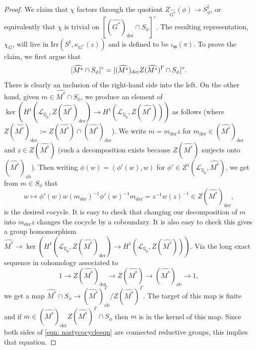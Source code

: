 \documentclass[reqno,11pt]{amsart}
\theoremstyle{remark}
\newcommand{\Irr}{\mathrm{Irr}}
\newcommand{\mc}{\mathcal}
\newcommand{\mf}{\mathfrak}
\newcommand{\Q}{\mathbb{Q}}
\newcommand{\der}{\mathrm{der}}
\newcommand{\ab}{\mathrm{ab}}
\begin{document}
\begin{proof}
We claim that $\chi$ factors through the quotient $Z_{\widehat{G^*}}(\phi) \to S^{\natural}_{\phi}$, or equivalently that $\chi$ is trivial on $[(\widehat{G^*})_{\der} \cap S_{\phi}]^{\circ}$. The resulting representation, $\chi_G$, will live in $\Irr(S^{\natural}, \kappa_{G^*}(z))$ and is defined to be $\iota_{\mf{w}}(\pi)$. To prove the claim, we first argue that
\begin{equation}{\label{eqn: nastycocycleeqn}}
    [\widehat{M^*} \cap S_{\phi}]^{\circ} =  [(\widehat{M^*})_{\der}Z(\widehat{M^*})^{\Gamma} \cap S_{\phi}]^{\circ}.
\end{equation}
There is clearly an inclusion of the right-hand side into the left. On the other hand, given $m \in \widehat{M^*} \cap S_{\phi}$, we produce an element of $\ker(H^1(\mc{L}_{\Q_p}, Z(\widehat{M^*})_{\der}) \to H^1(\mc{L}_{\Q_p}, Z(\widehat{M^*})))$ as follows (where $Z(\widehat{M^*})_{\der} := Z(\widehat{M^*}) \cap (\widehat{M^*})_{\der}$). We write $m = m_{\der}z$ for $m_{\der} \in (\widehat{M^*})_{\der}$ and  $z \in Z(\widehat{M^*})$ (such a decomposition exists because $Z(\widehat{M^*})$ surjects onto $(\widehat{M^*})_{\ab}$). Then writing $\phi(w) = (\phi'(w), w)$ for $\phi' \in Z^1(\mc{L}_{\Q_p}, \widehat{M^*})$, we get from $m \in S_{\phi}$ that 
\begin{equation*}
    w \mapsto \phi'(w)w(m_{\der})^{-1}\phi'(w)^{-1}m_{\der} = z^{-1}w(z)^{-1} \in Z(\widehat{M^*})_{\der},
\end{equation*}
is the desired cocycle. It is easy to check that changing our decomposition of $m$ into $m_{\der}z$ changes the cocycle by a coboundary. It is also easy to check this gives a group homomorphism $\widehat{M^*} \to \ker(H^1(\mc{L}_{\Q_p}, Z(\widehat{M^*})_{\der}) \to H^1(\mc{L}_{\Q_p}, Z(\widehat{M^*})))$. Via the long exact sequence in cohomology associated to
\begin{equation*}
    1 \to Z(\widehat{M^*})_{\der} \to Z(\widehat{M^*}) \to (\widehat{M^*})_{\ab} \to 1,
\end{equation*}
we get a map $\widehat{M^*} \cap S_{\phi} \to (\widehat{M^*})_{\ab}^{\Gamma} /Z(\widehat{M^*})^{\Gamma}$. The target of this map is finite and if $m \in (\widehat{M^*})_{\der}Z(\widehat{M^*})^{\Gamma} \cap S_{\phi}$ then $m$ is in the kernel of this map. Since both sides of \eqref{eqn: nastycocycleeqn} are connected reductive groups, this implies that equation.


\end{proof}
\end{document}
